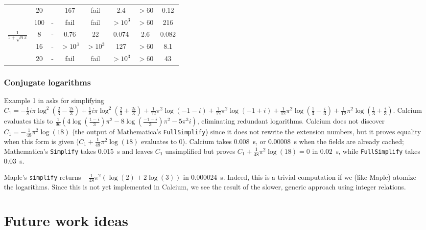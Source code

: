\documentclass[11pt,a4paper]{article}
\begin{document}
{\begin{table}
\begin{tabular}{ c c c c c c c c }
  & 20  &   -   &  167   &  fail  &  2.4 &   $>60$  &   0.12 \\
  & 100  &   -  &   fail   &  fail  &  $>10^3$ &   $>60$  &   216 \\
\hline
\multirow{4}{*}{\!\!$\frac{1}{1+\sqrt{n} \pi}$\!\!\!\!\!\!} & 8  &   -  &   0.76  &   22  &  0.074 &   2.6 &    0.082 \\
  & 16  &   -  &   $>10^3$   &  $>10^3$  &  127 &   $>60$  &   8.1 \\
  & 20  &   -  &   fail   &  fail   &  $>10^3$ &  $>60$  &   43 \\
\end{tabular}
\end{table}
}

\subsubsection{Conjugate logarithms}

Example 1 in \cite{BBK2014} asks for simplifying $C_1 = -\frac{1}{8} i \pi \log^{2}(\frac{2}{3} - \frac{2 i}{3}) + \frac{1}{8} i \pi \log^{2}(\frac{2}{3} + \frac{2 i}{3}) + \frac{1}{12} {\pi}^{2} \log(-1 - i) + \frac{1}{12} {\pi}^{2} \log(-1 + i) + \frac{1}{12} {\pi}^{2} \log(\frac{1}{3} - \frac{i}{3}) + \frac{1}{12} {\pi}^{2} \log(\frac{1}{3} + \frac{i}{3})$.
Calcium evaluates this to
$\tfrac{1}{96} (4 \log(\frac{1 - i}{3}) {\pi}^{2} - 8 \log(\frac{-1 - i}{3}) {\pi}^{2} - 5 {\pi}^{3} i)$,
eliminating redundant logarithms.
Calcium does not discover $C_1 = -\tfrac{1}{48} \pi^2 \log(18)$ (the output of Mathematica's \texttt{FullSimplify})
since it does not rewrite the extension numbers, but
it proves equality when this form is given ($C_1 + \tfrac{1}{48} \pi^2 \log(18)$ evaluates to 0).
Calcium takes 0.008~s, or 0.00008~s when the fields are already cached;
Mathematica's \texttt{Simplify} takes 0.015~s
and leaves $C_1$ unsimplified but proves $C_1 + \tfrac{1}{48} \pi^2 \log(18) = 0$ in 0.02~s, while \texttt{FullSimplify} takes 0.03~s.

Maple's \texttt{simplify} returns $-\tfrac{1}{48} \pi^2 (\log(2) + 2 \log(3))$ in 0.000024~s.
Indeed, this is a trivial computation if we (like Maple) atomize
the logarithms.
Since this is not yet implemented in Calcium,
we see the result of the slower, generic approach
using integer relations.

\section{Future work ideas}
\end{document}
